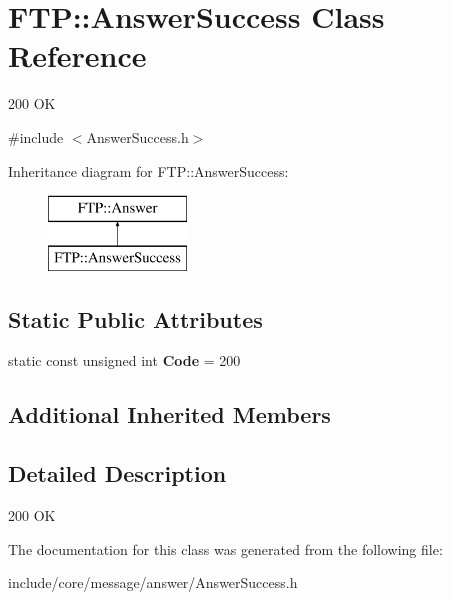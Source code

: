 \hypertarget{class_f_t_p_1_1_answer_success}{\section{F\-T\-P\-:\-:Answer\-Success Class Reference}
\label{class_f_t_p_1_1_answer_success}
}


200 O\-K  




{\ttfamily \#include $<$Answer\-Success.\-h$>$}

Inheritance diagram for F\-T\-P\-:\-:Answer\-Success\-:\begin{figure}[H]
\begin{center}
\leavevmode
\includegraphics[height=2.000000cm]{class_f_t_p_1_1_answer_success}
\end{center}
\end{figure}
\subsection*{Static Public Attributes}
\begin{DoxyCompactItemize}
\item 
\hypertarget{class_f_t_p_1_1_answer_success_a3708e95f733d7e0d8aa62864113dc20b}{static const unsigned int {\bfseries Code} = 200}\label{class_f_t_p_1_1_answer_success_a3708e95f733d7e0d8aa62864113dc20b}

\end{DoxyCompactItemize}
\subsection*{Additional Inherited Members}


\subsection{Detailed Description}
200 O\-K 

The documentation for this class was generated from the following file\-:\begin{DoxyCompactItemize}
\item 
include/core/message/answer/Answer\-Success.\-h\end{DoxyCompactItemize}
